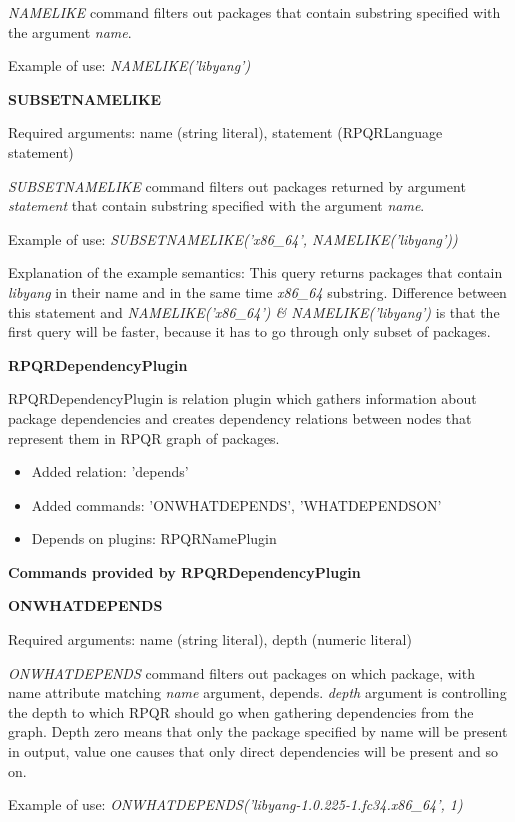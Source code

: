 \textit{NAMELIKE} command filters out packages that contain substring specified with the argument
\textit{name}.

Example of use: \textit{NAMELIKE('libyang')}

\newpage

\textbf{SUBSETNAMELIKE}

Required arguments: name (string literal), statement (RPQRLanguage statement)

\textit{SUBSETNAMELIKE} command filters out packages returned by argument \textit{statement} that
contain substring specified with the argument \textit{name}.

Example of use: \textit{SUBSETNAMELIKE('x86\_64', NAMELIKE('libyang'))}

Explanation of the example semantics: This query returns packages that contain \textit{libyang} in their
name and in the same time \textit{x86\_64} substring. Difference between this statement and
\textit{NAMELIKE('x86\_64') \& NAMELIKE('libyang')} is that the first query will be faster, because
it has to go through only subset of packages.

\textbf{RPQRDependencyPlugin}

RPQRDependencyPlugin is relation plugin which gathers information about package dependencies and
creates dependency relations between nodes that represent them in RPQR graph of packages.

\begin{itemize}
  \item Added relation: 'depends'
  \item Added commands: 'ONWHATDEPENDS', 'WHATDEPENDSON'
  \item Depends on plugins: RPQRNamePlugin
\end{itemize}

\textbf{Commands provided by RPQRDependencyPlugin}

\textbf{ONWHATDEPENDS}

Required arguments: name (string literal), depth (numeric literal)

\textit{ONWHATDEPENDS} command filters out packages on which package, with name attribute matching
\textit{name} argument, depends. \textit{depth} argument is controlling the depth to which RPQR
should go when gathering dependencies from the graph. Depth zero means that only the package specified
by name will be present in output, value one causes that only direct dependencies will be present and
so on.

Example of use: \textit{ONWHATDEPENDS('libyang-1.0.225-1.fc34.x86\_64', 1)}

